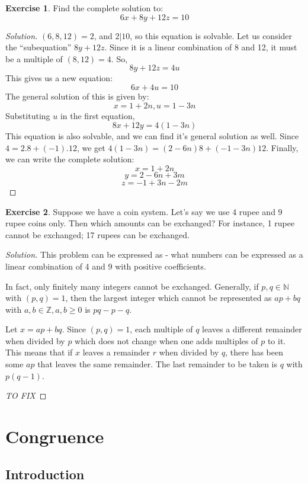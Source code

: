 \documentclass[12pt,letterpaper]{amsbook}
\theoremstyle{definition}
\newtheorem*{exercise}{Exercise}
\newenvironment{solution}
  {\renewcommand\qedsymbol{$\blacksquare$}\begin{proof}[Solution]}
  {\end{proof}}
\newcommand{\N}{\mathbb{N}}
\newcommand{\Z}{\mathbb{Z}}
\begin{document}
\begin{exercise}
  Find the complete solution to:
  \[6x+8y+12z=10\]
\end{exercise}
\begin{solution}
  $(6,8,12)  = 2$, and $2|10$, so this equation is solvable.
  Let us consider the ``subequation'' $8y+12z$. Since it is a linear combination of 8 and 12, it must be a multiple of $(8,12) = 4$. So,
  \[8y+12z = 4u\]
  This gives us a new equation:
  \[6x+4u = 10\]
  The general solution of this is given by:
  \[x = 1+2n, u = 1-3n\]
  Substituting $u$ in the first equation,
  \[8x+12y = 4(1-3n)\]
  This equation is also solvable, and we can find it's general solution as well. Since $4=2.8 + (-1).12$, we get $4(1-3n) = (2-6n)8 + (-1-3n)12$. Finally, we can write the complete solution:
  \[x = 1+2n\]
  \[y = 2-6n + 3m\]
  \[z = -1+3n -2m\]
\end{solution}

\begin{exercise}
  Suppose we have a coin system. Let's say we use 4 rupee and 9 rupee coins only. Then which amounts can be exchanged? For instance, 1 rupee cannot be exchanged; 17 rupees can be exchanged.
\end{exercise}
\begin{solution}
  This problem can be expressed as - what numbers can be expressed as a linear combination of 4 and 9 with positive coefficients.

  In fact, only finitely many integers cannot be exchanged. Generally, if $p,q \in \N$ with $(p,q) = 1$, then the largest integer which cannot be represented as $ap+bq$ with $a,b \in \Z, a,b \geq 0$ is $pq-p-q$.

  Let $x = ap+bq$. Since $(p,q) = 1$, each multiple of $q$ leaves a different remainder when divided by $p$ which does not change when one adds multiples of $p$ to it. This means that if $x$ leaves a remainder $r$ when divided by $q$, there has been some $ap$ that leaves the same remainder. The last remainder to be taken is $q$ with $p(q-1)$.

  \textit{TO FIX}
\end{solution}

\chapter{Congruence}

\section{Introduction}
\end{document}
